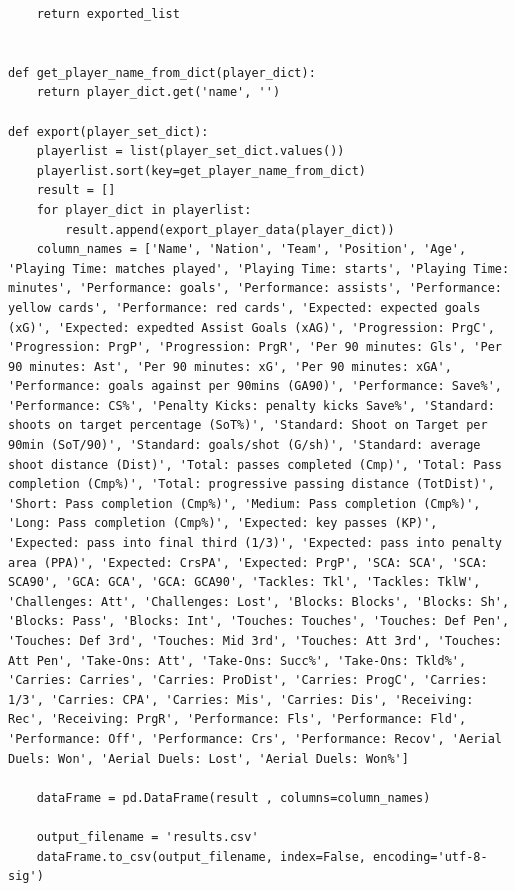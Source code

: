 \documentclass[12pt]{report}
\begin{document}
{\begin{lstlisting}
    return exported_list


def get_player_name_from_dict(player_dict):
    return player_dict.get('name', '')
    
def export(player_set_dict):
    playerlist = list(player_set_dict.values())
    playerlist.sort(key=get_player_name_from_dict)
    result = []
    for player_dict in playerlist:
        result.append(export_player_data(player_dict)) 
    column_names = ['Name', 'Nation', 'Team', 'Position', 'Age', 'Playing Time: matches played', 'Playing Time: starts', 'Playing Time: minutes', 'Performance: goals', 'Performance: assists', 'Performance: yellow cards', 'Performance: red cards', 'Expected: expected goals (xG)', 'Expected: expedted Assist Goals (xAG)', 'Progression: PrgC', 'Progression: PrgP', 'Progression: PrgR', 'Per 90 minutes: Gls', 'Per 90 minutes: Ast', 'Per 90 minutes: xG', 'Per 90 minutes: xGA', 'Performance: goals against per 90mins (GA90)', 'Performance: Save%', 'Performance: CS%', 'Penalty Kicks: penalty kicks Save%', 'Standard: shoots on target percentage (SoT%)', 'Standard: Shoot on Target per 90min (SoT/90)', 'Standard: goals/shot (G/sh)', 'Standard: average shoot distance (Dist)', 'Total: passes completed (Cmp)', 'Total: Pass completion (Cmp%)', 'Total: progressive passing distance (TotDist)', 'Short: Pass completion (Cmp%)', 'Medium: Pass completion (Cmp%)', 'Long: Pass completion (Cmp%)', 'Expected: key passes (KP)', 'Expected: pass into final third (1/3)', 'Expected: pass into penalty area (PPA)', 'Expected: CrsPA', 'Expected: PrgP', 'SCA: SCA', 'SCA: SCA90', 'GCA: GCA', 'GCA: GCA90', 'Tackles: Tkl', 'Tackles: TklW', 'Challenges: Att', 'Challenges: Lost', 'Blocks: Blocks', 'Blocks: Sh', 'Blocks: Pass', 'Blocks: Int', 'Touches: Touches', 'Touches: Def Pen', 'Touches: Def 3rd', 'Touches: Mid 3rd', 'Touches: Att 3rd', 'Touches: Att Pen', 'Take-Ons: Att', 'Take-Ons: Succ%', 'Take-Ons: Tkld%', 'Carries: Carries', 'Carries: ProDist', 'Carries: ProgC', 'Carries: 1/3', 'Carries: CPA', 'Carries: Mis', 'Carries: Dis', 'Receiving: Rec', 'Receiving: PrgR', 'Performance: Fls', 'Performance: Fld', 'Performance: Off', 'Performance: Crs', 'Performance: Recov', 'Aerial Duels: Won', 'Aerial Duels: Lost', 'Aerial Duels: Won%'] 

    dataFrame = pd.DataFrame(result , columns=column_names)

    output_filename = 'results.csv'
    dataFrame.to_csv(output_filename, index=False, encoding='utf-8-sig') 
\end{lstlisting}

}
\end{document}
